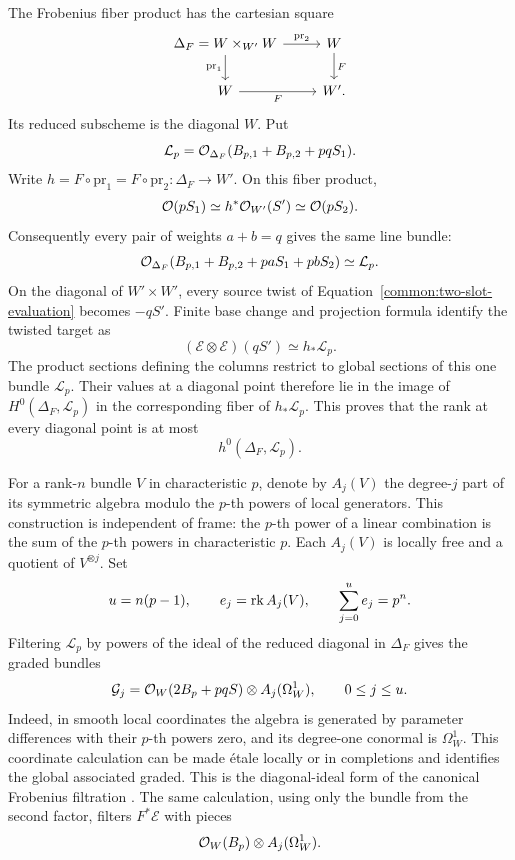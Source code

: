 The Frobenius fiber product has the cartesian square
\begin{equation}\label{common:frobenius-square}
\begin{tikzcd}
 \Delta_F=W\times_{W'}W \arrow[r,"\mathrm{pr}_2"] \arrow[d,"\mathrm{pr}_1"'] & W \arrow[d,"F"]\\
 W \arrow[r,"F"'] & W'.
\end{tikzcd}
\end{equation}
Its reduced subscheme is the diagonal $W$.  Put
\[
 \mathcal L_p=
 \mathcal{O}_{\Delta_F}(B_{p,1}+B_{p,2}+pqS_1).
\]
Write $h=F\circ\mathrm{pr}_1=F\circ\mathrm{pr}_2:
\Delta_F\to W'$. On this fiber product,
\[
 \mathcal{O}(pS_1)\simeq h^*\mathcal{O}_{W'}(S')\simeq\mathcal{O}(pS_2).
\]
Consequently every pair of weights $a+b=q$ gives the same line bundle:
\[
 \mathcal{O}_{\Delta_F}(B_{p,1}+B_{p,2}+paS_1+pbS_2)
 \simeq\mathcal L_p.
\]
On the diagonal of $W'\times W'$, every source twist of
Equation~\eqref{common:two-slot-evaluation} becomes $-qS'$.
Finite base change and projection formula identify the twisted target as
\[
 (\mathcal E\otimes\mathcal E)(qS')\simeq h_*\mathcal L_p.
\]
The product sections defining the columns restrict to global sections
of this one bundle $\mathcal L_p$. Their values at a diagonal point
therefore lie in the image of $H^0(\Delta_F,\mathcal L_p)$ in the
corresponding fiber of $h_*\mathcal L_p$. This proves that the rank
at every diagonal point is at most
\begin{equation}\label{common:diagonal-rank-upper}
 h^0(\Delta_F,\mathcal L_p).
\end{equation}

For a rank-$n$ bundle $V$ in characteristic $p$, denote by $A_j(V)$
the degree-$j$ part of its symmetric algebra modulo the $p$-th powers
of local generators.  This construction is independent of frame:
the $p$-th power of a linear combination is the sum of the $p$-th
powers in characteristic $p$.  Each $A_j(V)$ is locally free and a
quotient of $V^{\otimes j}$.  Set
\[
 u=n(p-1),\qquad e_j=\operatorname{rk} A_j(V),\qquad
 \sum_{j=0}^u e_j=p^n.
\]
Filtering $\mathcal L_p$ by powers of the ideal of the reduced
diagonal in $\Delta_F$ gives the graded bundles
\begin{equation}\label{common:diagonal-graded}
 \mathcal G_j=\mathcal{O}_W(2B_p+pqS)\otimes A_j(\Omega_W^1),
 \qquad 0\le j\le u.
\end{equation}
Indeed, in smooth local coordinates the algebra is generated by
parameter differences with their $p$-th powers zero, and its
degree-one conormal is $\Omega_W^1$.  This coordinate calculation
can be made étale locally or in completions and identifies the
global associated graded.  This is the diagonal-ideal form of the canonical Frobenius filtration
\cite[Corollary~3.5]{KitadaiSumihiro2008}. The same calculation, using
only the bundle from the second factor, filters $F^*\mathcal E$ with pieces
\cite[Theorem~3.7]{Sun2008}
\begin{equation}\label{common:Frob-pullback-graded}
 \mathcal{O}_W(B_p)\otimes A_j(\Omega_W^1).
\end{equation}

